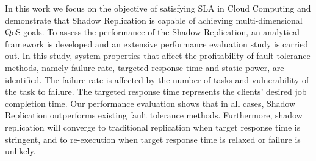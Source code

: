 In this work we focus on the objective of satisfying SLA in Cloud Computing and demonstrate that Shadow Replication is capable of achieving multi-dimensional QoS goals. 
To assess the performance of the Shadow Replication, an analytical framework is developed and 
an extensive performance evaluation study is carried out. 
In this study, system properties that affect the
profitability of fault tolerance methods, namely failure rate,
targeted response time and static power, are identified. The failure rate is
affected by the number of tasks and vulnerability of the task
to failure. The targeted response time represents the 
clients' desired job completion time.  
Our performance evaluation shows that in all cases, Shadow Replication outperforms
existing fault tolerance methods. Furthermore, shadow
replication will converge to traditional replication when target response time is stringent, and to re-execution when target response time is relaxed or failure is unlikely.


   




